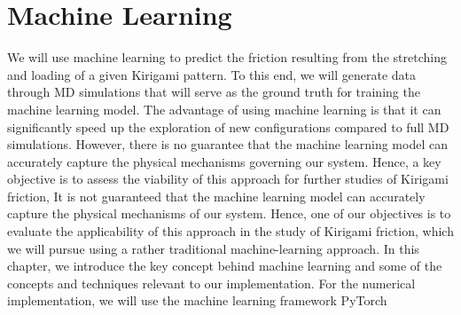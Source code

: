\chapter{Machine Learning}\label{chap:ML}
We will use machine learning to predict the friction resulting from the stretching
and loading of a given Kirigami pattern. To this end, we will generate data through \acrshort{MD} simulations that will serve as the ground truth for training the machine learning model. The advantage of using machine learning is that it can significantly speed up the exploration of new configurations compared to full \acrshort{MD} simulations. However, there is no guarantee that the machine learning model can accurately capture the physical mechanisms governing our system. Hence, a key objective is to assess
the viability of this approach for further studies of Kirigami friction, It is not guaranteed that the machine learning model can accurately
capture the physical mechanisms of our system. Hence, one of our objectives is to evaluate the applicability of this approach in the study of Kirigami friction, which we will pursue using a rather traditional machine-learning approach. In this
chapter, we introduce the key concept behind machine learning and some of the concepts and techniques relevant to our implementation. For the numerical implementation, we will use the machine learning framework PyTorch~\cite{NEURIPS2019_9015}


